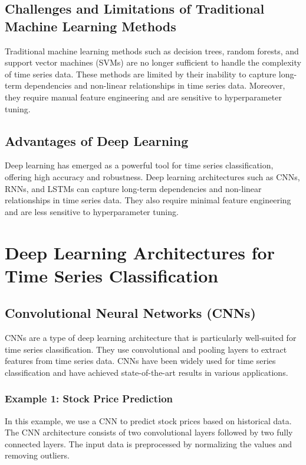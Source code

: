\documentclass{article}
\begin{document}
\subsection{Challenges and Limitations of Traditional Machine Learning Methods}

Traditional machine learning methods such as decision trees, random forests, and support vector machines (SVMs) are no longer sufficient to handle the complexity of time series data. These methods are limited by their inability to capture long-term dependencies and non-linear relationships in time series data. Moreover, they require manual feature engineering and are sensitive to hyperparameter tuning.

\subsection{Advantages of Deep Learning}

Deep learning has emerged as a powerful tool for time series classification, offering high accuracy and robustness. Deep learning architectures such as CNNs, RNNs, and LSTMs can capture long-term dependencies and non-linear relationships in time series data. They also require minimal feature engineering and are less sensitive to hyperparameter tuning.

\section{Deep Learning Architectures for Time Series Classification}

\subsection{Convolutional Neural Networks (CNNs)}

CNNs are a type of deep learning architecture that is particularly well-suited for time series classification. They use convolutional and pooling layers to extract features from time series data. CNNs have been widely used for time series classification and have achieved state-of-the-art results in various applications.

\subsubsection{Example 1: Stock Price Prediction}

In this example, we use a CNN to predict stock prices based on historical data. The CNN architecture consists of two convolutional layers followed by two fully connected layers. The input data is preprocessed by normalizing the values and removing outliers.
\end{document}
